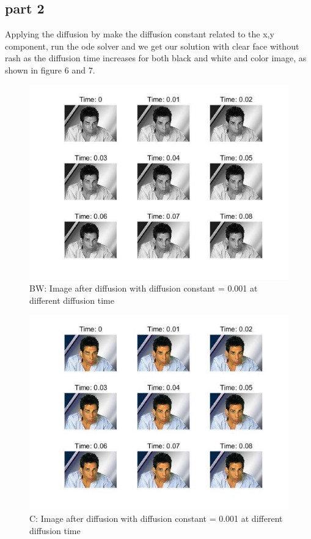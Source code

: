 \documentclass[12pt,letterpaper]{article}
\begin{document}
\subsection{part 2}
Applying the diffusion by make the diffusion constant related to the x,y component, run the ode solver and we get our solution with clear face without rash as the diffusion time increases for both black and white and color image, as shown in figure 6 and 7.
	\begin{figure}[h]
		\caption{BW: Image after diffusion with diffusion constant = 0.001 at different diffusion time}
		\centering
		\includegraphics[width=1.4\textwidth]{Part2BW1}
	\end{figure}
\begin{figure}[h]
	\caption{C: Image after diffusion with diffusion constant = 0.001 at different diffusion time}
	\centering
	\includegraphics[width=1.4\textwidth]{Part2C1}
\end{figure}
\end{document}
